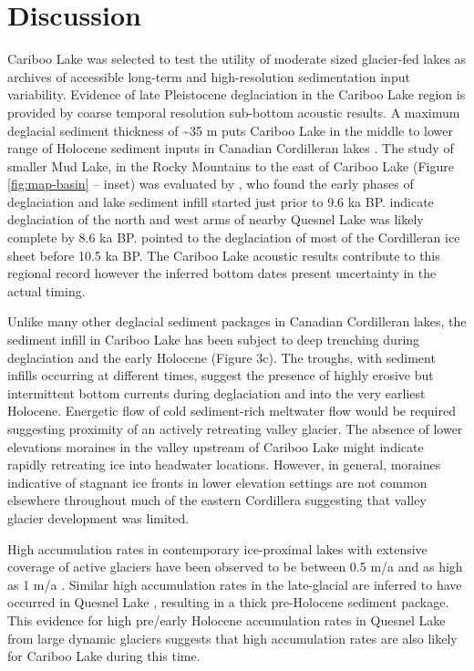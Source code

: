 \documentclass[Royal,times,doublespace,sageh]{sagej}
\begin{document}
\hypertarget{discussion}{%
\section{Discussion}\label{discussion}}

Cariboo Lake was selected to test the utility of moderate sized
glacier-fed lakes as archives of accessible long-term and
high-resolution sedimentation input variability. Evidence of late
Pleistocene deglaciation in the Cariboo Lake region is provided by
coarse temporal resolution sub-bottom acoustic results. A maximum
deglacial sediment thickness of \textasciitilde35 m puts Cariboo Lake in
the middle to lower range of Holocene sediment inputs in Canadian
Cordilleran lakes \citep[see detailed discussion in][]{Gilbert2012}. The
study of smaller Mud Lake, in the Rocky Mountains to the east of Cariboo
Lake (Figure \ref{fig:map-basin} -- inset) was evaluated by
\citet{Hodder2006b}, who found the early phases of deglaciation and lake
sediment infill started just prior to 9.6 ka BP. \citet{Gilbert2012}
indicate deglaciation of the north and west arms of nearby Quesnel Lake
was likely complete by 8.6 ka BP. \citet{Menounos2009b} pointed to the
deglaciation of most of the Cordilleran ice sheet before 10.5 ka BP. The
Cariboo Lake acoustic results contribute to this regional record however
the inferred bottom dates present uncertainty in the actual timing.

Unlike many other deglacial sediment packages in Canadian Cordilleran
lakes, the sediment infill in Cariboo Lake has been subject to deep
trenching during deglaciation and the early Holocene (Figure 3c). The
troughs, with sediment infills occurring at different times, suggest the
presence of highly erosive but intermittent bottom currents during
deglaciation and into the very earliest Holocene. Energetic flow of cold
sediment-rich meltwater flow would be required suggesting proximity of
an actively retreating valley glacier. The absence of lower elevations
moraines in the valley upstream of Cariboo Lake might indicate rapidly
retreating ice into headwater locations. However, in general, moraines
indicative of stagnant ice fronts in lower elevation settings are not
common elsewhere throughout much of the eastern Cordillera suggesting
that valley glacier development was limited.

High accumulation rates in contemporary ice-proximal lakes with
extensive coverage of active glaciers have been observed to be between
0.5 m/a \citep{Crookshanks2008} and as high as 1 m/a
\citep{Gilbert1997}. Similar high accumulation rates in the late-glacial
are inferred to have occurred in Quesnel Lake \citep{Gilbert2012},
resulting in a thick pre-Holocene sediment package. This evidence for
high pre/early Holocene accumulation rates in Quesnel Lake from large
dynamic glaciers suggests that high accumulation rates are also likely
for Cariboo Lake during this time.
\end{document}
